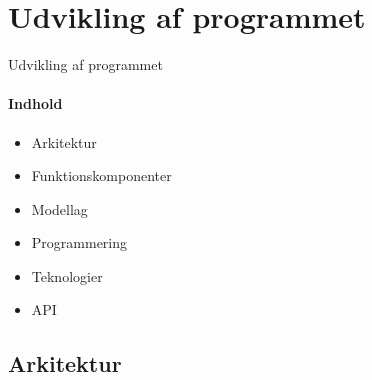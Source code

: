 \section{Udvikling af programmet}
	\begin{frame}{Udvikling af programmet}\framesubtitle{Indhold}
		 \begin{itemize}
		 	\item Arkitektur
		 	\item Funktionskomponenter
		 	\item Modellag
		 	\item Programmering
		 	\item Teknologier
		 	\item API
		 \end{itemize}
	\end{frame}
	\subsection{Arkitektur}
